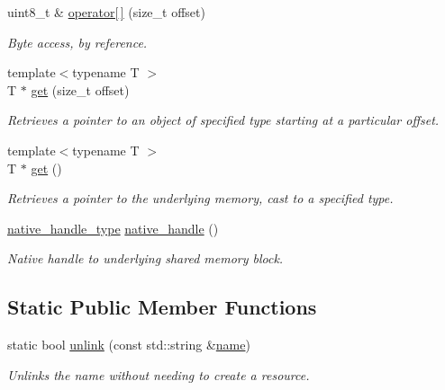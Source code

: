 \begin{DoxyCompactItemize}
uint8\+\_\+t \& \hyperlink{classcpen333_1_1process_1_1posix_1_1shared__memory_a832b82cb6ab398e814418b516dba2dd9}{operator\mbox{[}$\,$\mbox{]}} (size\+\_\+t offset)
\begin{DoxyCompactList}\small\item\em Byte access, by reference. \end{DoxyCompactList}\item 
{\footnotesize template$<$typename T $>$ }\\T $\ast$ \hyperlink{classcpen333_1_1process_1_1posix_1_1shared__memory_a09582d7b2863aebbbd74d2f32d0b1af8}{get} (size\+\_\+t offset)
\begin{DoxyCompactList}\small\item\em Retrieves a pointer to an object of specified type starting at a particular offset. \end{DoxyCompactList}\item 
{\footnotesize template$<$typename T $>$ }\\T $\ast$ \hyperlink{classcpen333_1_1process_1_1posix_1_1shared__memory_a705beedc2e0b3bde2e044fe742f641ea}{get} ()
\begin{DoxyCompactList}\small\item\em Retrieves a pointer to the underlying memory, cast to a specified type. \end{DoxyCompactList}\item 
\hyperlink{classcpen333_1_1process_1_1posix_1_1shared__memory_a4bec0d0093c8bcfa3283a5da8ef1fc78}{native\+\_\+handle\+\_\+type} \hyperlink{classcpen333_1_1process_1_1posix_1_1shared__memory_ac0dd258666565953b8c6bdbde7aa871f}{native\+\_\+handle} ()
\begin{DoxyCompactList}\small\item\em Native handle to underlying shared memory block. \end{DoxyCompactList}\end{DoxyCompactItemize}
\subsection*{Static Public Member Functions}
\begin{DoxyCompactItemize}
\item 
static bool \hyperlink{classcpen333_1_1process_1_1posix_1_1shared__memory_a68a9ecfafed3c939bc9c38edee71d584}{unlink} (const std\+::string \&\hyperlink{classcpen333_1_1process_1_1impl_1_1named__resource__base_ae0c5fbb1843afe863cece4b51c38f807}{name})
\begin{DoxyCompactList}\small\item\em Unlinks the name without needing to create a resource. \end{DoxyCompactList}\end{DoxyCompactItemize}
